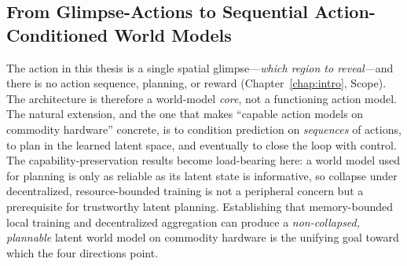 \subsection{From Glimpse-Actions to Sequential Action-Conditioned World Models}
The action in this thesis is a single spatial glimpse---\emph{which region to
reveal}---and there is no action sequence, planning, or reward
(Chapter~\ref{chap:intro}, Scope). The architecture is therefore a world-model
\emph{core}, not a functioning action model. The natural extension, and the one
that makes ``capable action models on commodity hardware'' concrete, is to
condition prediction on \emph{sequences} of actions, to plan in the learned
latent space, and eventually to close the loop with control. The
capability-preservation results become load-bearing here: a world model used
for planning is only as reliable as its latent state is informative, so
collapse under decentralized, resource-bounded training is not a peripheral
concern but a prerequisite for trustworthy latent planning. Establishing that
memory-bounded local training and decentralized aggregation can produce a
\emph{non-collapsed, plannable} latent world model on commodity hardware is the
unifying goal toward which the four directions point.
